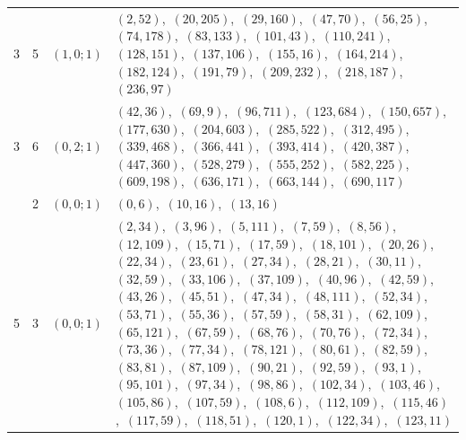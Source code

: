 \documentclass[11pt]{article}
\begin{document}
\begin{longtable}{@{}rrl>{\raggedright\arraybackslash}p{}@{}}
3 & 5 & $(1,0;1)$ & $(2,52)$,\allowbreak\ $(20,205)$,\allowbreak\ $(29,160)$,\allowbreak\ $(47,70)$,\allowbreak\ $(56,25)$,\allowbreak\ $(74,178)$,\allowbreak\ $(83,133)$,\allowbreak\ $(101,43)$,\allowbreak\ $(110,241)$,\allowbreak\ $(128,151)$,\allowbreak\ $(137,106)$,\allowbreak\ $(155,16)$,\allowbreak\ $(164,214)$,\allowbreak\ $(182,124)$,\allowbreak\ $(191,79)$,\allowbreak\ $(209,232)$,\allowbreak\ $(218,187)$,\allowbreak\ $(236,97)$\\
3 & 6 & $(0,2;1)$ & $(42,36)$,\allowbreak\ $(69,9)$,\allowbreak\ $(96,711)$,\allowbreak\ $(123,684)$,\allowbreak\ $(150,657)$,\allowbreak\ $(177,630)$,\allowbreak\ $(204,603)$,\allowbreak\ $(285,522)$,\allowbreak\ $(312,495)$,\allowbreak\ $(339,468)$,\allowbreak\ $(366,441)$,\allowbreak\ $(393,414)$,\allowbreak\ $(420,387)$,\allowbreak\ $(447,360)$,\allowbreak\ $(528,279)$,\allowbreak\ $(555,252)$,\allowbreak\ $(582,225)$,\allowbreak\ $(609,198)$,\allowbreak\ $(636,171)$,\allowbreak\ $(663,144)$,\allowbreak\ $(690,117)$\\
\addlinespace[3pt]
5 & 2 & $(0,0;1)$ & $(0,6)$,\allowbreak\ $(10,16)$,\allowbreak\ $(13,16)$\\
5 & 3 & $(0,0;1)$ & $(2,34)$,\allowbreak\ $(3,96)$,\allowbreak\ $(5,111)$,\allowbreak\ $(7,59)$,\allowbreak\ $(8,56)$,\allowbreak\ $(12,109)$,\allowbreak\ $(15,71)$,\allowbreak\ $(17,59)$,\allowbreak\ $(18,101)$,\allowbreak\ $(20,26)$,\allowbreak\ $(22,34)$,\allowbreak\ $(23,61)$,\allowbreak\ $(27,34)$,\allowbreak\ $(28,21)$,\allowbreak\ $(30,11)$,\allowbreak\ $(32,59)$,\allowbreak\ $(33,106)$,\allowbreak\ $(37,109)$,\allowbreak\ $(40,96)$,\allowbreak\ $(42,59)$,\allowbreak\ $(43,26)$,\allowbreak\ $(45,51)$,\allowbreak\ $(47,34)$,\allowbreak\ $(48,111)$,\allowbreak\ $(52,34)$,\allowbreak\ $(53,71)$,\allowbreak\ $(55,36)$,\allowbreak\ $(57,59)$,\allowbreak\ $(58,31)$,\allowbreak\ $(62,109)$,\allowbreak\ $(65,121)$,\allowbreak\ $(67,59)$,\allowbreak\ $(68,76)$,\allowbreak\ $(70,76)$,\allowbreak\ $(72,34)$,\allowbreak\ $(73,36)$,\allowbreak\ $(77,34)$,\allowbreak\ $(78,121)$,\allowbreak\ $(80,61)$,\allowbreak\ $(82,59)$,\allowbreak\ $(83,81)$,\allowbreak\ $(87,109)$,\allowbreak\ $(90,21)$,\allowbreak\ $(92,59)$,\allowbreak\ $(93,1)$,\allowbreak\ $(95,101)$,\allowbreak\ $(97,34)$,\allowbreak\ $(98,86)$,\allowbreak\ $(102,34)$,\allowbreak\ $(103,46)$,\allowbreak\ $(105,86)$,\allowbreak\ $(107,59)$,\allowbreak\ $(108,6)$,\allowbreak\ $(112,109)$,\allowbreak\ $(115,46)$,\allowbreak\ $(117,59)$,\allowbreak\ $(118,51)$,\allowbreak\ $(120,1)$,\allowbreak\ $(122,34)$,\allowbreak\ $(123,11)$\\

\end{longtable}
\end{document}
